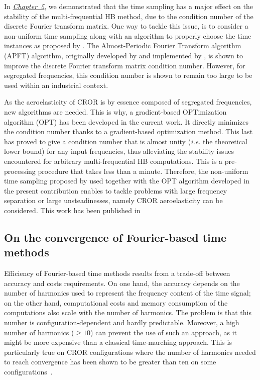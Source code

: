 In \hyperref[cha:limitations_condition_number]{\emph{Chapter~5}},
we demonstrated that the time sampling has a major effect on the
stability of the multi-frequential HB 
method, due to the condition number of the discrete Fourier
transform matrix. One way to tackle this issue, 
is to consider a non-uniform time sampling
along with an algorithm to properly choose the time instances
as proposed by \citet{ThesisGuedeney}.
The Almost-Periodic Fourier Transform algorithm (APFT) 
algorithm, originally developed by \citet{Kundert1988} and implemented by 
\citet{ThesisGuedeney}, is shown to improve the discrete
Fourier transform matrix condition number.
However, for segregated frequencies, this condition number
is shown to remain too large to be used within an industrial context.

As the aeroelasticity of CROR is by essence
composed of segregated frequencies, new algorithms are needed.
This is why, a gradient-based OPTimization algorithm (OPT) 
has been developed in the current work.
It directly minimizes the condition number thanks to a
gradient-based optimization method. This last has proved to
give a condition number that is almost unity (\emph{i.e.} the
theoretical lower bound) for any input frequencies,
thus alleviating the stability issues encountered for arbitrary
multi-frequential HB computations.
This is a pre-processing procedure
that takes less than a minute.
Therefore, the non-uniform time sampling proposed by \citet{ThesisGuedeney}
used together with the OPT algorithm 
developed in the present contribution
enables to tackle problems with large frequency 
separation or large unsteadinesses, namely CROR aeroelasticity
can be considered.
This work has been published in
\begin{quote}
\end{quote}


\subsection*{On the convergence of Fourier-based time methods}

Efficiency of Fourier-based time methods results 
from a trade-off between accuracy and 
costs requirements.
On one hand, the accuracy depends on the number of harmonics
used to represent the frequency content of the time 
signal; on the other hand, computational costs and 
memory consumption of the computations also scale
with the number of harmonics. 
The problem is that this number is 
configuration-dependent and hardly predictable. 
Moreover, a high number of harmonics
($\geq 10$) can prevent the use of such an approach,
as it might be more expensive than a classical time-marching approach.
This is particularly true on CROR configurations where the number
of harmonics needed to reach convergence
has been shown to be greater than ten
on some configurations~\cite{ThesisFrancois}.

